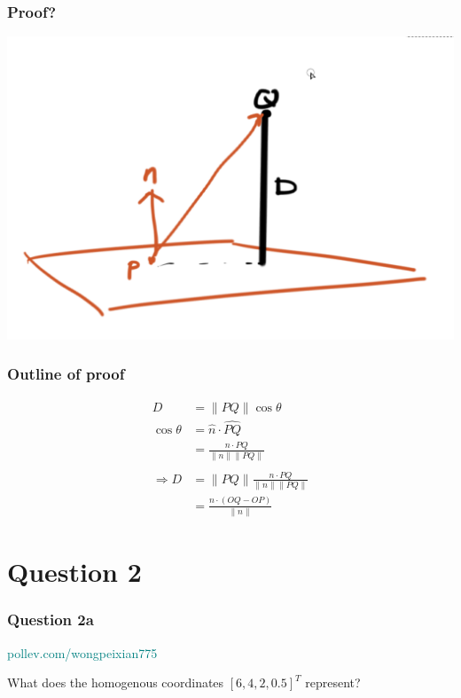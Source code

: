 \documentclass{beamer}
\begin{document}
\begin{frame}
    \frametitle{Proof?}

    \begin{center}
        \includegraphics[scale=0.5]{distance_perp.png}
    \end{center}

\end{frame}

\begin{frame}
    \frametitle{Outline of proof}

    \begin{eqnarray*}
        D &= \|PQ\| \cos \theta \\
        \cos \theta &= \widehat{n} \cdot \widehat{PQ} \\
        &= \frac{n \cdot PQ}{\|n\| \|PQ\|} \\
        \\
        \Rightarrow D &= \|PQ\| \frac{n \cdot PQ}{\|n\| \|PQ\|} \\
        &= \frac{n \cdot (OQ - OP)}{\|n\|}
    \end{eqnarray*}

\end{frame}

\section{Question 2}

\begin{frame}
    \frametitle{Question 2a}

    \begin{tcolorbox}[colback=teal!5!white]
        \textcolor{teal}{pollev.com/wongpeixian775}
    \end{tcolorbox}

    \vspace{1em}
    
    What does the homogenous coordinates $[6, 4, 2, 0.5]^T$ represent?

\end{frame}
\end{document}
